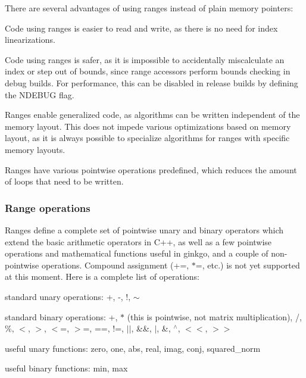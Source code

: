There are several advantages of using ranges instead of plain memory pointers\+:


\begin{DoxyEnumerate}
\item Code using ranges is easier to read and write, as there is no need for index linearizations.
\item Code using ranges is safer, as it is impossible to accidentally miscalculate an index or step out of bounds, since range accessors perform bounds checking in debug builds. For performance, this can be disabled in release builds by defining the {\ttfamily N\+D\+E\+B\+UG} flag.
\item Ranges enable generalized code, as algorithms can be written independent of the memory layout. This does not impede various optimizations based on memory layout, as it is always possible to specialize algorithms for ranges with specific memory layouts.
\item Ranges have various pointwise operations predefined, which reduces the amount of loops that need to be written.
\end{DoxyEnumerate}

\subsubsection*{Range operations }

Ranges define a complete set of pointwise unary and binary operators which extend the basic arithmetic operators in C++, as well as a few pointwise operations and mathematical functions useful in ginkgo, and a couple of non-\/pointwise operations. Compound assignment ({\ttfamily +=}, {\ttfamily $\ast$=}, etc.) is not yet supported at this moment. Here is a complete list of operations\+:


\begin{DoxyItemize}
\item standard unary operations\+: {\ttfamily +}, {\ttfamily -\/}, {\ttfamily !}, {\ttfamily $\sim$}
\item standard binary operations\+: {\ttfamily +}, {\ttfamily $\ast$} (this is pointwise, not matrix multiplication), {\ttfamily /}, {\ttfamily \%}, {\ttfamily $<$}, {\ttfamily $>$}, {\ttfamily $<$=}, {\ttfamily $>$=}, {\ttfamily ==}, {\ttfamily !=}, {\ttfamily $\vert$$\vert$}, {\ttfamily \&\&}, {\ttfamily $\vert$}, {\ttfamily \&}, {\ttfamily $^\wedge$}, {\ttfamily $<$$<$}, {\ttfamily $>$$>$}
\item useful unary functions\+: {\ttfamily zero}, {\ttfamily one}, {\ttfamily abs}, {\ttfamily real}, {\ttfamily imag}, {\ttfamily conj}, {\ttfamily squared\+\_\+norm}
\item useful binary functions\+: {\ttfamily min}, {\ttfamily max}
\end{DoxyItemize}

